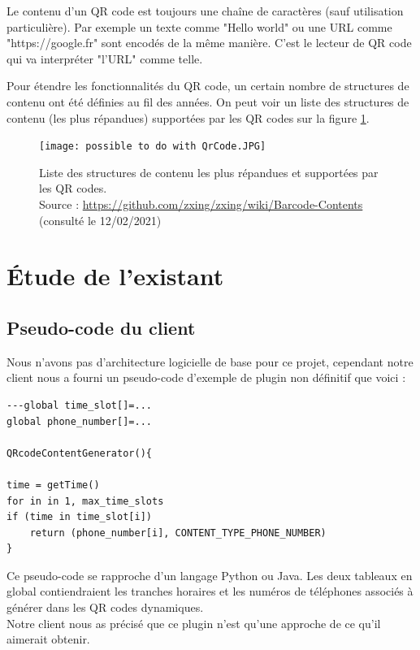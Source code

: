 \documentclass[a4paper,12pt]{article}
\begin{document}
\begin{itemize}
Le contenu d'un QR code est toujours une chaîne de caractères (sauf utilisation particulière). Par exemple un texte comme "Hello world" ou une URL comme "https://google.fr" sont encodés de la même manière. C'est le lecteur de QR code qui va interpréter "l'URL" comme telle. 

Pour étendre les fonctionnalités du QR code, un certain nombre de structures de contenu ont été définies au fil des années. On peut voir un liste des structures de contenu (les plus répandues) supportées par les QR codes sur la figure \ref{fig:listStructureContent}.


\begin{figure}[H]
    \begin{center}
        \texttt{[image: possible to do with QrCode.JPG]}
        \caption{Liste des structures de contenu les plus répandues et supportées par les QR codes.\\Source : \url{https://github.com/zxing/zxing/wiki/Barcode-Contents} (consulté le 12/02/2021)}
        \label{fig:listStructureContent}
    \end{center}
\end{figure}

\end{itemize}
\section{Étude de l'existant}

\iffalse %
\subsection{Pseudo-code du client}



Nous n'avons pas d'architecture logicielle de base pour ce projet, cependant notre client nous a fourni un pseudo-code d'exemple de plugin non définitif que voici :\\

\begin{lstlisting}
---global time_slot[]=...
global phone_number[]=...

QRcodeContentGenerator(){

time = getTime()
for in in 1, max_time_slots
if (time in time_slot[i])
    return (phone_number[i], CONTENT_TYPE_PHONE_NUMBER)
}
\end{lstlisting}

Ce pseudo-code se rapproche d'un langage Python ou Java. Les deux tableaux en global contiendraient les tranches horaires et les numéros de téléphones associés à générer dans les QR codes dynamiques.\\
Notre client nous as précisé que ce plugin n'est qu'une approche de ce qu'il aimerait obtenir.
\end{document}
